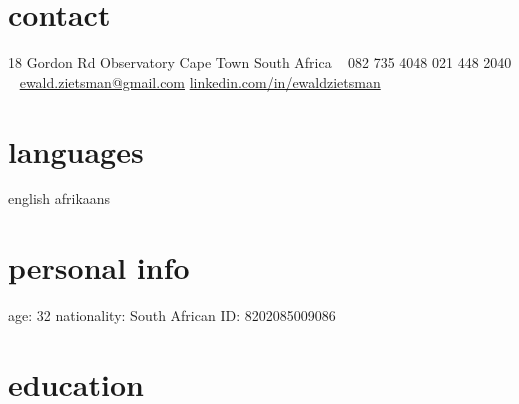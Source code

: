 \documentclass[]{friggeri-cv} %
\begin{document}


\begin{aside} %
\section{contact}
18 Gordon Rd
Observatory
Cape Town
South Africa
~
082 735 4048
021 448 2040
~
\href{mailto:ewald.zietsman@gmail.com}{ewald.zietsman@gmail.com}
\href{http://za.linkedin.com/in/ewaldzietsman/}{linkedin.com/in/ewaldzietsman}
\section{languages}
english 
afrikaans
\section{personal info}
age: 32
nationality: South African
ID: 8202085009086
\end{aside}


\section{education}
\end{document}
